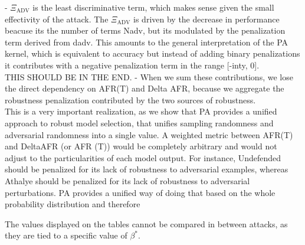 - $\Xi_{\text{ADV}}$ is the least discriminative term, which makes sense given the small effectivity
of the attack. The $\Xi_{\text{ADV}}$ is driven by the decrease in performance beacuse its the number
of terms Nadv, but its modulated by the penalization term derived from dadv. This amounts to
the general interpretation of the PA kernel, which is equivalent to accuracy but instead of adding 
binary penalizations it contributes with a negative penalization term in the range [-inty, 0].\\

THIS SHOULD BE IN THE END.
- When we sum these contributions, we lose the direct dependency on AFR(T) and Delta AFR, because
we aggregate the robustness penalization contributed by the two sources of robustness. \\
This is a very important realization, as we show that PA provides a unified approach to robust model
selection, that unifies sampling randomness and adversarial randomness into a single
value. A weighted metric between AFR(T) and DeltaAFR (or AFR (T)) would be completely arbitrary
and would not adjust to the particularities of each model output. For instance, Undefended should be
penalized for its lack of robustness to adversarial examples, whereas Athalye should be penalized
for its lack of robustness to adversarial perturbations. PA provides a unified way of doing that
based on the whole probability distribution and therefore 


The values displayed on the tables cannot be compared in between attacks, as they are tied
to a specific value of $\beta^{*}$. 


